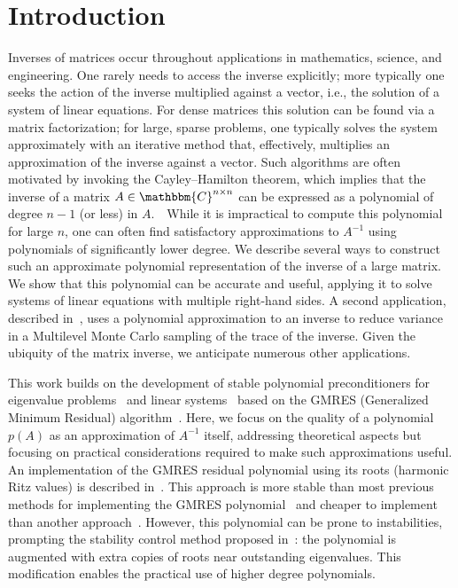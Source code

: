 \documentclass{siamart}
\def\C{\mathbbm{C}}
\begin{document}
\pagestyle{myheadings}
\thispagestyle{plain}

\section{Introduction}

Inverses of matrices occur throughout applications in mathematics, science, and engineering.  One rarely needs to access the inverse explicitly;  more typically one seeks the action of the inverse multiplied against a vector, i.e., the solution of a system of linear equations.  For dense matrices this solution can be found via a matrix factorization; for large, sparse problems, one typically solves the system approximately with an iterative method that, effectively, multiplies an approximation of the inverse against a vector.  Such algorithms are often motivated by invoking the Cayley--Hamilton theorem, which implies that the inverse of a matrix $A\in\C^{n\times n}$ can be expressed as a polynomial of degree $n-1$ (or less) in $A$.\ \ While it is impractical to compute this polynomial for large $n$, one can often find satisfactory approximations to $A^{-1}$ using polynomials of significantly lower degree.  We describe several ways to construct such an approximate polynomial representation of the inverse of a large matrix.  We show that this polynomial can be accurate and useful, applying it to solve systems of linear equations with multiple right-hand sides.  A second application, described in~\cite{HighDegrPolyQCD,MultPolyMonteCarlo}, uses a polynomial approximation to an inverse to reduce variance in a Multilevel Monte Carlo sampling of the trace of the inverse.  Given the ubiquity of the matrix inverse, we anticipate numerous other applications. 


This work builds on the development of stable polynomial preconditioners for eigenvalue problems~\cite{PPArn,Tho06} and linear systems~\cite{PPGStable} based on the GMRES (Generalized Minimum Residual) algorithm~\cite{SaSc}.  
Here, we focus on the quality of a polynomial $p(A)$ as an approximation of $A^{-1}$ itself,
addressing theoretical aspects but focusing on practical considerations required to make such
approximations useful.
An implementation of the GMRES residual polynomial using its roots (harmonic Ritz values) is described in~\cite{PPArn}.  This approach is more stable than most previous methods for implementing the GMRES polynomial~\cite{seed,Jo,PPG,NaReTr} and cheaper to implement than another approach~\cite{Tho06}.  However, this polynomial can be prone to instabilities, prompting the stability control method proposed in~\cite{PPArn}: the polynomial is augmented with extra copies of roots near outstanding eigenvalues.  This modification enables the practical use of higher degree polynomials.
\end{document}
